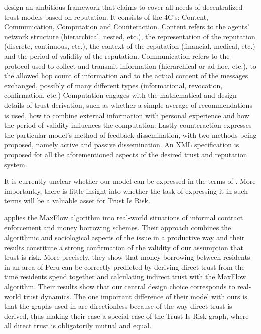   \cite{sdt} design an ambitious framework that claims to cover all needs of decentralized trust models based on reputation.
  It consists of the 4C's: Content, Communication, Computation and Counteraction. Content refers to the agents' network
  structure (hierarchical, nested, etc.), the representation of the reputation (discrete, continuous, etc.), the context of
  the reputation (financial, medical, etc.) and the period of validity of the reputation. Communication refers to the
  protocol used to collect and transmit information (hierarchical or ad-hoc, etc.), to the allowed hop count of information
  and to the actual content of the messages exchanged, possibly of many different types (informational, revocation,
  confirmation, etc.) Computation engages with the mathematical and design details of trust derivation, such as whether a
  simple average of recommendations is used, how to combine external information with personal experience and how the period
  of validity influences the computation. Lastly counteraction expresses the particular model's method of feedback
  dissemination, with two methods being proposed, namely active and passive dissemination. An XML specification is proposed
  for all the aforementioned aspects of the desired trust and reputation system.

  It is currently unclear whether our model can be expressed in the terms of \cite{sdt}. More importantly, there is little
  insight into whether the task of expressing it in such terms will be a valuable asset for Trust Is Risk.

  \cite{kmrs} applies the MaxFlow algorithm into real-world situations of informal contract enforcement and money borrowing
  schemes. Their approach combines the algorithmic and sociological aspects of the issue in a productive way and their
  results constitute a strong confirmation of the validity of our assumption that trust is risk. More precisely, they show
  that money borrowing between residents in an area of Peru can be correctly predicted by deriving direct trust from the time
  residents spend together and calculating indirect trust with the MaxFlow algorithm. Their results show that our central
  design choice corresponds to real-world trust dynamics. The one important difference of their model with ours is that
  the graphs used in \cite{kmrs} are directionless because of the way direct trust is derived, thus making their case a
  special case of the Trust Is Risk graph, where all direct trust is obligatorily mutual and equal.

